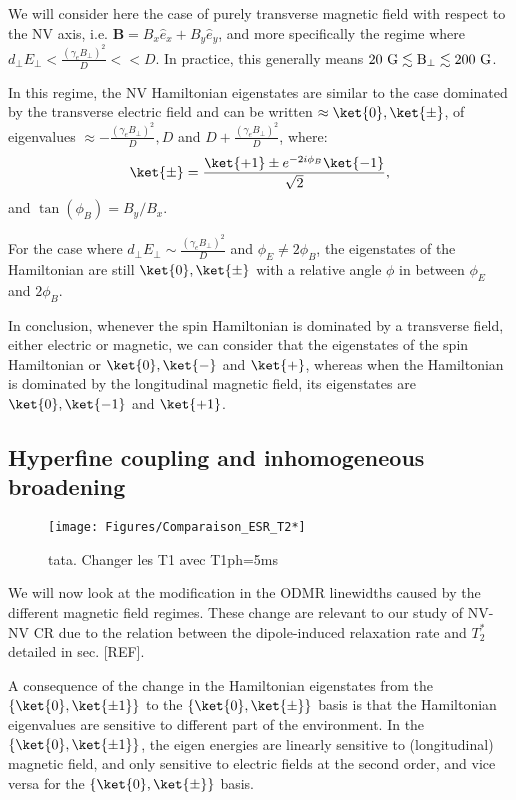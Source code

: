 \documentclass[a4paper,11pt]{report}
\begin{document}
We will consider here the case of purely transverse magnetic field with respect to the NV axis, i.e. $\mathbf{B}=B_x \hat{e}_x + B_y \hat e_y$, and more specifically the regime where $d_\perp E_\perp < \frac{(\gamma_e B_\perp)^2}{D} << D$. In practice, this generally means $20\ \rm G \lesssim B_\perp \lesssim 200\ \rm G$.

In this regime, the NV Hamiltonian eigenstates are similar to the case dominated by the transverse electric field and can be written $\approx \ket{0}, \ket{\pm}$\citep{qiu2021nuclear, qiu2022nanoscale}, of eigenvalues $\approx -\frac{(\gamma_e B_\perp)^2}{D},D$ and $D+\frac{(\gamma_e B_\perp)^2}{D}$,  where:
\begin{equation}
\ket{\pm}=\frac{\ket{+1}\pm e^{-2i\phi_B}\ket{-1}}{\sqrt{2}},
\end{equation}
and $\tan(\phi_B)=B_y/B_x$.

For the case where $d_\perp E_\perp \sim \frac{(\gamma_e B_\perp)^2}{D}$ and $\phi_E \neq 2\phi_B$, the eigenstates of the Hamiltonian are still $\ket{0},\ket{\pm}$ with a relative angle $\phi$ in between $\phi_E$ and $2\phi_B$.

In conclusion, whenever the spin Hamiltonian is dominated by a transverse field, either electric or magnetic, we can consider that the eigenstates of the spin Hamiltonian or $\ket{0}, \ket{-}$ and $\ket{+}$, whereas when the Hamiltonian is dominated by the longitudinal magnetic field, its eigenstates are $\ket{0}, \ket{-1}$ and $\ket{+1}$.

\subsection{Hyperfine coupling and inhomogeneous broadening}
\label{sec modif T2*}
\begin{figure}[h]
\centering
\texttt{[image: Figures/Comparaison\_ESR\_T2*]}
\caption{tata. Changer les T1 avec T1ph=5ms}
\label{ESR for T2*}
\end{figure}

We will now look at the modification in the ODMR linewidths caused by the different magnetic field regimes. These change are relevant to our study of NV-NV CR due to the relation between the dipole-induced relaxation rate and $T_2^*$ detailed in sec. [REF].

A consequence of the change in the Hamiltonian eigenstates from the $\{ \ket{0}, \ket{\pm 1} \}$ to the $\{ \ket{0}, \ket{\pm} \}$ basis is that the Hamiltonian eigenvalues are sensitive to different part of the environment. In the $\{ \ket{0}, \ket{\pm 1} \}$, the eigen energies are linearly sensitive to (longitudinal) magnetic field, and only sensitive to electric fields at the second order, and vice versa for the $\{ \ket{0}, \ket{\pm} \}$ basis.
\end{document}
